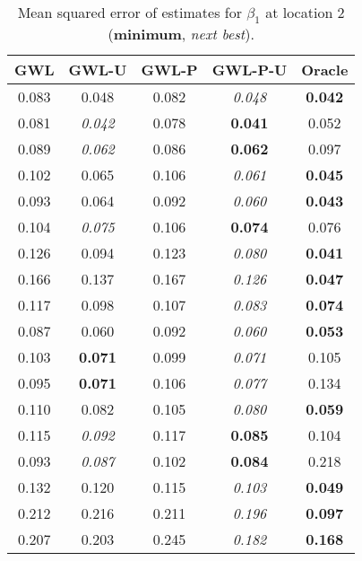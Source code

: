 \documentclass[authoryear, review, 11pt]{elsarticle}
\begin{document}
\begin{table}[ht]
\begin{center}
\begin{tabular}{ccccc}
 GWL & GWL-U & GWL-P & GWL-P-U & Oracle \\ 
  \hline
0.083 & 0.048 & 0.082 & \emph{0.048} & \textbf{0.042} \\ 
  0.081 & \emph{0.042} & 0.078 & \textbf{0.041} & 0.052 \\ 
  0.089 & \emph{0.062} & 0.086 & \textbf{0.062} & 0.097 \\ 
  0.102 & 0.065 & 0.106 & \emph{0.061} & \textbf{0.045} \\ 
  0.093 & 0.064 & 0.092 & \emph{0.060} & \textbf{0.043} \\ 
  0.104 & \emph{0.075} & 0.106 & \textbf{0.074} & 0.076 \\ 
  0.126 & 0.094 & 0.123 & \emph{0.080} & \textbf{0.041} \\ 
  0.166 & 0.137 & 0.167 & \emph{0.126} & \textbf{0.047} \\ 
  0.117 & 0.098 & 0.107 & \emph{0.083} & \textbf{0.074} \\ 
  0.087 & 0.060 & 0.092 & \emph{0.060} & \textbf{0.053} \\ 
  0.103 & \textbf{0.071} & 0.099 & \emph{0.071} & 0.105 \\ 
  0.095 & \textbf{0.071} & 0.106 & \emph{0.077} & 0.134 \\ 
  0.110 & 0.082 & 0.105 & \emph{0.080} & \textbf{0.059} \\ 
  0.115 & \emph{0.092} & 0.117 & \textbf{0.085} & 0.104 \\ 
  0.093 & \emph{0.087} & 0.102 & \textbf{0.084} & 0.218 \\ 
  0.132 & 0.120 & 0.115 & \emph{0.103} & \textbf{0.049} \\ 
  0.212 & 0.216 & 0.211 & \emph{0.196} & \textbf{0.097} \\ 
  0.207 & 0.203 & 0.245 & \emph{0.182} & \textbf{0.168} \\ 
  \end{tabular}
\caption{Mean squared error of estimates for $\beta_1$ at location 2 (\textbf{minimum}, \emph{next best}).\label{MSEX-nonzero}}
\end{center}
\end{table}
\end{document}
